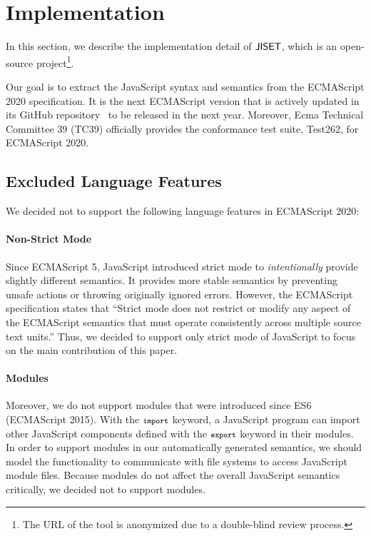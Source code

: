 \section{Implementation}\label{sec:impl}
In this section, we describe the implementation detail of \( \text{\sf JISET} \),
which is an open-source project\footnote{The URL of the tool is anonymized
due to a double-blind review process.}.

Our goal is to extract the JavaScript syntax and semantics from the
ECMAScript 2020 specification.  It is the next ECMAScript version
that is actively updated in its GitHub repository~\cite{es2020}
to be released in the next year.  Moreover, Ecma Technical Committee 39 (TC39)
officially provides the conformance test suite, Test262, for ECMAScript 2020.

\subsection{Excluded Language Features}\label{sec:exclusion}
We decided not to support the following language features in ECMAScript 2020:

\paragraph{Non-Strict Mode}
Since ECMAScript 5, JavaScript introduced strict mode to
\textit{intentionally} provide slightly different semantics.  It
provides more stable semantics by preventing unsafe actions or
throwing originally ignored errors.  However, the ECMAScript
specification states that ``Strict mode does not restrict or modify
any aspect of the ECMAScript semantics that must operate consistently
across multiple source text units.''  Thus, we decided to support only
strict mode of JavaScript to focus on the main contribution of this
paper.

\paragraph{Modules}
Moreover, we do not support modules that were introduced since ES6
(ECMAScript 2015).  With the \( \texttt{\footnotesize import} \) keyword, a JavaScript
program can import other JavaScript components defined with the \(
\texttt{\footnotesize export} \) keyword in their modules.  In order to support
modules in our automatically generated semantics, we should model the
functionality to communicate with file systems to access JavaScript
module files.  Because modules do not affect the overall JavaScript
semantics critically, we decided not to support modules.

